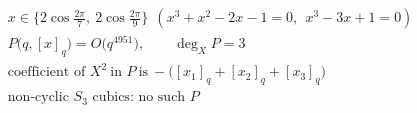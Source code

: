 \documentclass{article}
\begin{document}
\[
\begin{aligned}
&x\in\bigl\{2\cos\tfrac{2\pi}{7},\ 2\cos\tfrac{2\pi}{9}\bigr\}\ \ (x^{3}+x^{2}-2x-1=0,\ \ x^{3}-3x+1=0)\\
&P\bigl(q,[x]_q\bigr)=O\bigl(q^{4951}\bigr),\qquad \deg_X P=3\\
&\text{coefficient of }X^{2}\ \text{in }P\ \text{is}\ -\bigl([x_1]_q+[x_2]_q+[x_3]_q\bigr)\\
&\text{non-cyclic }S_3\text{ cubics: no such }P
\end{aligned}
\]
\end{document}
